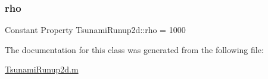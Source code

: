 \subsubsection{\texorpdfstring{rho}{rho}}
{\footnotesize\ttfamily Constant Property Tsunami\+Runup2d\+::rho = 1000}



The documentation for this class was generated from the following file\+:\begin{DoxyCompactItemize}
\item 
\hyperlink{_tsunami_runup2d_8m}{Tsunami\+Runup2d.\+m}\end{DoxyCompactItemize}
